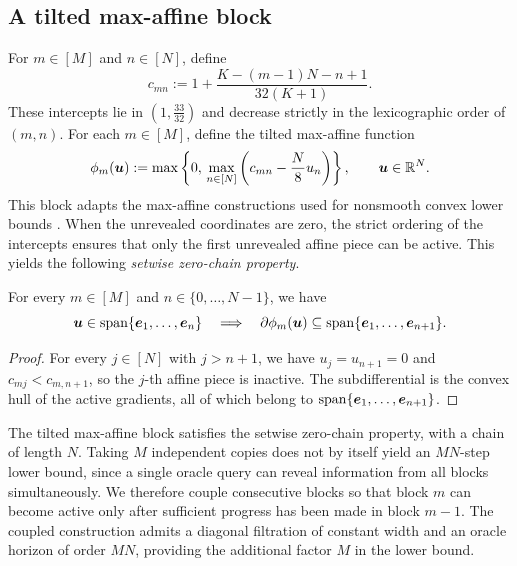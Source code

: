 \subsection{A tilted max-affine block}
For $m\in[M]$ and $n\in[N]$, define
\begin{equation}
 c_{mn}
 :=1+\frac{K-(m-1)N-n+1}{32(K+1)}.
 \label{newrand:fan}
\end{equation}
These intercepts lie in $(1,\tfrac{33}{32})$ and decrease strictly
in the lexicographic order of $(m,n)$.
For each $m\in[M]$, define the tilted max-affine function
\[
 \phi_m(\bm{u})
 :=
 \max\left\{
   0,\,
   \max_{n\in[N]}
   \left(c_{mn}-\frac N8 u_n\right)
 \right\},
 \qquad \bm{u}\in{\mathbb{R}}^N.
\]
This block adapts the max-affine constructions used for
nonsmooth convex lower bounds
\citep{WoodworthSrebro2017,DiakonikolasGuzman2020}.
When the unrevealed coordinates are zero, the strict ordering
of the intercepts ensures that only the first unrevealed affine
piece can be active. This yields the following \emph{setwise
zero-chain property}.
\begin{lemma}
\label{lem:tilted-block-locality}
For every {$m\in[M]$ and} \(n\in\{0,\ldots,N-1\}\), we have 
\[
 \bm{u}\in\operatorname{span}\{\bm{e}_1,\ldots,\bm{e}_n\}
 \quad\Longrightarrow\quad
 \partial\phi_{m}(\bm{u})
 \subseteq
 \operatorname{span}\{\bm{e}_1,\ldots,
\bm{e}_{n+1}\}.
\]
\end{lemma}
\begin{proof}
For every $j\in[N]$ with $j>n+1$, we have $u_j=u_{n+1}=0$ and
$c_{mj}<c_{m,n+1}$, so the $j$-th affine piece is inactive.
The subdifferential is the convex hull of the active gradients,
all of which belong to
$\operatorname{span}\{\bm{e}_1,\ldots,\bm{e}_{n+1}\}$.
\end{proof}
The tilted max-affine block satisfies the setwise zero-chain
property, with a chain of length $N$. Taking $M$ independent
copies does not by itself yield an $MN$-step lower bound,
since a single oracle query can reveal information from
all blocks simultaneously. We therefore couple consecutive
blocks so that block $m$ can become active only after
sufficient progress has been made in block $m-1$.
The coupled construction admits a diagonal filtration
of constant width and an oracle horizon of order $MN$,
providing the additional factor $M$ in the lower bound.


